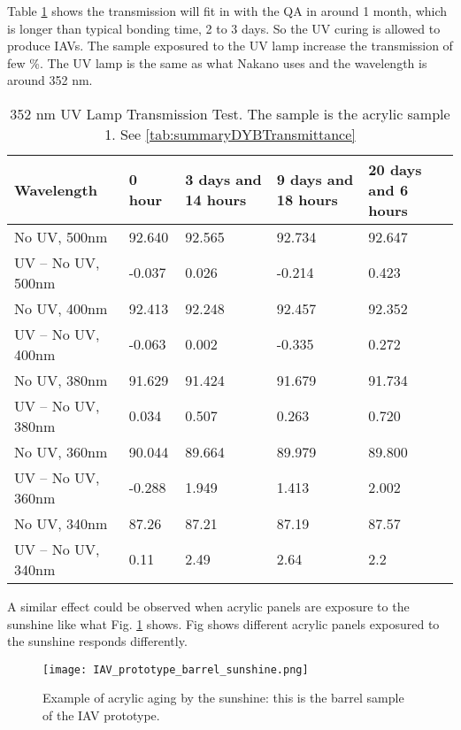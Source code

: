 



Table \ref{tab:UVLampTest}
shows the transmission will fit in with the QA in around 1 month, which is longer than typical
bonding time, 2 to 3 days. So the UV curing is allowed to produce IAVs.
The sample exposured to the UV lamp increase the transmission of few \%.
The UV lamp is the same as what Nakano uses and the wavelength is around 352 nm.

\begin{table}
\centering
\caption{352 nm UV Lamp Transmission Test. The sample is the acrylic sample 1. See \ref{tab:summaryDYBTransmittance}}
\label{tab:UVLampTest}
\begin{tabular}{lp{2.5cm}p{2.5cm}p{2.5cm}p{2.5cm}}
\hline
Wavelength &  0 hour & 3 days and 14 hours & 9 days and 18 hours & 20 days and 6 hours \\
\hline
\hline
No UV, 500nm        &92.640  &92.565  &92.734  &92.647 \\
UV – No UV, 500nm   &-0.037  &0.026   &-0.214  &0.423\\
No UV, 400nm        &92.413  &92.248  &92.457  &92.352\\
UV – No UV, 400nm   &-0.063  &0.002   &-0.335  &0.272\\
No UV, 380nm        &91.629  &91.424  &91.679  &91.734\\
UV – No UV, 380nm   &0.034   &0.507   &0.263   &0.720\\
No UV, 360nm        &90.044  &89.664  &89.979  &89.800\\
UV – No UV, 360nm   &-0.288  &1.949   &1.413   &2.002\\
No UV, 340nm        &87.26   &87.21   &87.19   &87.57\\
UV – No UV, 340nm   &0.11    &2.49    &2.64    &2.2\\

\hline
\end{tabular}
\end{table}


A similar effect could be observed when acrylic panels are exposure to the sunshine like what
Fig. \ref{IAVPrototypeBarrelSunshineAging} shows. Fig shows different
acrylic panels exposured to the sunshine responds differently.


\begin{figure}
    \centering
    \texttt{[image: IAV\_prototype\_barrel\_sunshine.png]}
    \caption{Example of acrylic aging by the sunshine: this is the barrel sample of the IAV prototype.}
    \label{IAVPrototypeBarrelSunshineAging}
    \end{figure}



